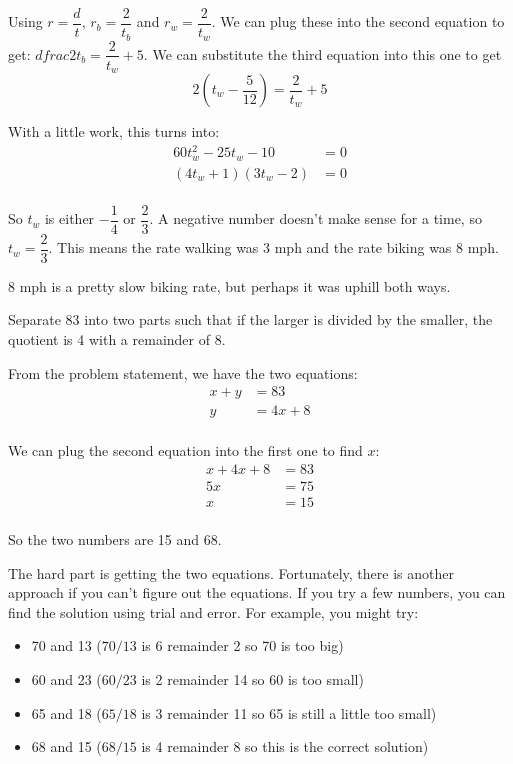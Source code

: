 \documentclass[fleqn,addpoints]{exam}
\begin{document}
\begin{questions}
\begin{solution}[1cm]
Using $r=\dfrac{d}{t}$, $r_b = \dfrac{2}{t_b}$ and $r_w = \dfrac{2}{t_w}$.  We can plug these into the second equation
to get: $dfrac{2}{t_b} = \dfrac{2}{t_w} + 5$.  We can substitute the third equation into this one to get
\[
  2\left(t_w - \dfrac{5}{12} \right) = \dfrac{2}{t_w} + 5
\]

With a little work, this turns into:
\begin{align*}
  60t_w^2 - 25t_w - 10 &= 0 \\
  (4t_w + 1)(3t_w - 2) &= 0 \\
\end{align*}

So $t_w$ is either $- \dfrac{1}{4}$ or $\dfrac{2}{3}$.  A negative number doesn't make sense for a time, so $t_w =
\dfrac{2}{3}$.  This means the rate walking was 3 mph and the rate biking was 8 mph.  

8 mph is a pretty slow biking rate, but perhaps it was uphill both ways.

\end{solution}

\question
Separate 83 into two parts such that if the larger is divided by the smaller, the quotient is 4 with a remainder of 8.

\begin{solution}[1cm]
From the problem statement, we have the two equations:
\begin{align*}
  x+y &= 83 \\
  y &= 4x + 8 \\
\end{align*}

We can plug the second equation into the first one to find $x$:
\begin{align*}
  x+4x+8 &= 83 \\
  5x &= 75 \\
  x &= 15 \\
\end{align*}

So the two numbers are 15 and 68.

\vspace{.5 cm}

The hard part is getting the two equations.  Fortunately, there is another approach if you can't figure out the
equations.  If you try a few numbers, you can find the solution using trial and error.  For example, you might try:
\begin{itemize}
  \item 70 and 13 ($70/13$ is 6 remainder 2 so 70 is too big)
  \item 60 and 23 ($60/23$ is 2 remainder 14 so 60 is too small)
  \item 65 and 18 ($65/18$ is 3 remainder 11 so 65 is still a little too small)
  \item 68 and 15 ($68/15$ is 4 remainder 8 so this is the correct solution)
\end{itemize}


\end{solution}
\end{questions}
\end{document}
